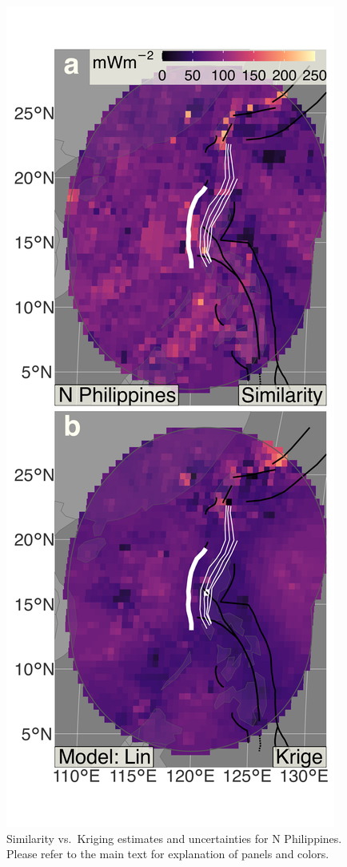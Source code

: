\begin{figure}
\centering
\includegraphics{assets/figs/chpt3/NPhilippinesDiffComp.png}
\caption[Similarity vs.~Kriging estimates and uncertainties for N Philippines]{Similarity vs.~Kriging estimates and uncertainties for N Philippines. Please refer to the main text for explanation of panels and colors.}
\end{figure}

